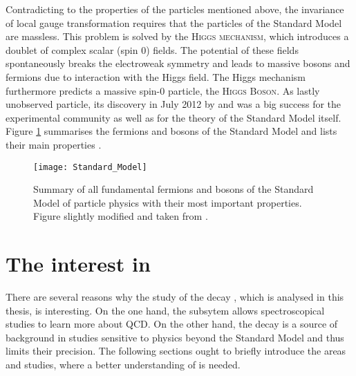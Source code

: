 Contradicting to the properties of the particles mentioned above, the invariance of local gauge transformation requires that the particles of the Standard Model are massless.
This problem is solved by the \textsc{Higgs mechanism}, which introduces a doublet of complex scalar (spin 0) fields.
The potential of these fields spontaneously breaks the electroweak symmetry and leads to massive bosons and fermions due to interaction with the Higgs field.
The Higgs mechanism furthermore predicts a massive spin-0 particle, the \textsc{Higgs Boson}.
As lastly unobserved particle, its discovery in July 2012 by \atlas \cite{Higgs_ATLAS} and \cms \cite{Higgs_CMS} was a big success for the experimental community as well as for the theory of the Standard Model itself. 
Figure \ref{fig:SM} summarises the fermions and bosons of the Standard Model and lists their main properties \cite{Perkins_HEP, Burgess_SM, Meissner}.
\begin{figure}[tb]
    \centering
	\texttt{[image: Standard\_Model]}	
	\caption{Summary of all fundamental fermions and bosons of the Standard Model of particle physics with their most important properties. Figure slightly modified and taken from \cite{SM_figure}.}
	\label{fig:SM}
\end{figure}

\section{The interest in \LbToDpmunuX}
There are several reasons why the study of the decay \LbToDpmunuX, which is analysed in this thesis, is interesting.
On the one hand, the \Dz\proton subsytem allows spectroscopical studies to learn more about QCD.
On the other hand, the decay is a source of background in studies sensitive to physics beyond the Standard Model and thus limits their precision.
The following sections ought to briefly introduce the areas and studies, where a better understanding of \LbToDpmunuX is needed.

